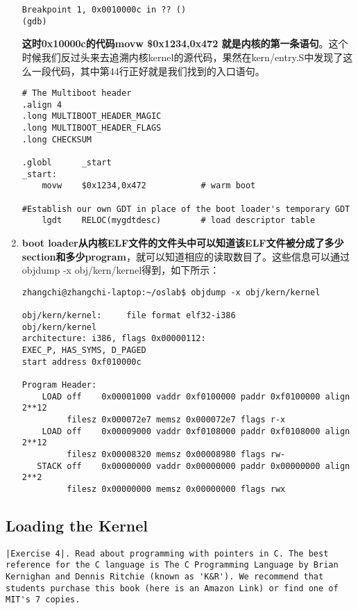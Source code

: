 \documentclass{article}
\newcommand{\highlight}[1]{{\bfseries \color{red}  #1}}
\begin{document}
\begin{CJK*}{UTF8}{gkai}
\begin{enumerate}
{\begin{lstlisting}[style=console]
Breakpoint 1, 0x0010000c in ?? ()
(gdb) 
\end{lstlisting}

\highlight{这时0x10000c的代码movw \hspace{1ex}\$0x1234,0x472 就是内核的第一条语句}。这个时候我们反过头来去追溯内核kernel的源代码，果然在kern/entry.S中发现了这么一段代码，其中第44行正好就是我们找到的入口语句。

\begin{lstlisting}[style=acode, firstnumber=36, title={\scriptsize \ttfamily \bfseries kern/entry.S}]
# The Multiboot header
.align 4
.long MULTIBOOT_HEADER_MAGIC
.long MULTIBOOT_HEADER_FLAGS
.long CHECKSUM

.globl      _start
_start:
    movw    $0x1234,0x472           # warm boot

#Establish our own GDT in place of the boot loader's temporary GDT
    lgdt    RELOC(mygdtdesc)        # load descriptor table
\end{lstlisting}
}

\item{\highlight{boot loader从内核ELF文件的文件头中可以知道该ELF文件被分成了多少section和多少program}，就可以知道相应的读取数目了。这些信息可以通过objdump -x obj/kern/kernel得到，如下所示：
\begin{lstlisting}[style=console]
zhangchi@zhangchi-laptop:~/oslab$ objdump -x obj/kern/kernel

obj/kern/kernel:     file format elf32-i386
obj/kern/kernel
architecture: i386, flags 0x00000112:
EXEC_P, HAS_SYMS, D_PAGED
start address 0xf010000c

Program Header:
    LOAD off    0x00001000 vaddr 0xf0100000 paddr 0xf0100000 align 2**12
         filesz 0x000072e7 memsz 0x000072e7 flags r-x
    LOAD off    0x00009000 vaddr 0xf0108000 paddr 0xf0108000 align 2**12
         filesz 0x00008320 memsz 0x00008980 flags rw-
   STACK off    0x00000000 vaddr 0x00000000 paddr 0x00000000 align 2**2
         filesz 0x00000000 memsz 0x00000000 flags rwx

\end{lstlisting}
}
\end{enumerate}

\subsection{Loading the Kernel}

\begin{lstlisting}[style=exercise]
|Exercise 4|. Read about programming with pointers in C. The best reference for the C language is The C Programming Language by Brian Kernighan and Dennis Ritchie (known as 'K&R'). We recommend that students purchase this book (here is an Amazon Link) or find one of MIT's 7 copies.


\end{lstlisting}
\end{CJK*}
\end{document}
